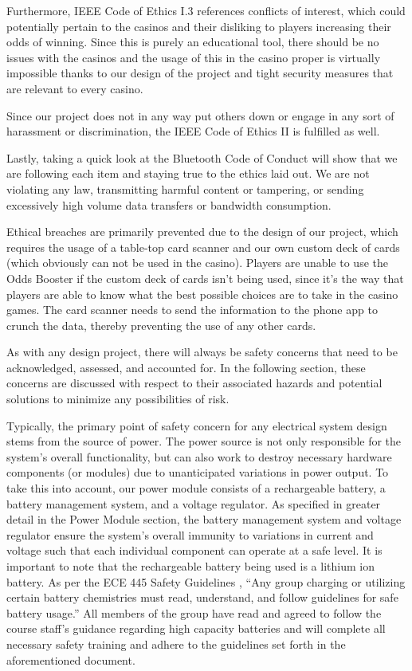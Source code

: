 \documentclass[12pt]{article}
\begin{document}
Furthermore, IEEE Code of Ethics I.3 \cite{IEEE_ethics} references conflicts of interest, which could potentially pertain to the casinos and their disliking to players increasing their odds of winning. Since this is purely an educational tool, there should be no issues with the casinos and the usage of this in the casino proper is virtually impossible thanks to our design of the project and tight security measures that are relevant to every casino.

Since our project does not in any way put others down or engage in any sort of harassment or discrimination, the IEEE Code of Ethics II \cite{IEEE_ethics} is fulfilled as well. 

Lastly, taking a quick look at the Bluetooth Code of Conduct \cite{BT_conduct} will show that we are following each item and staying true to the ethics laid out. We are not violating any law, transmitting harmful content or tampering, or sending excessively high volume data transfers or bandwidth consumption.

Ethical breaches are primarily prevented due to the design of our project, which requires the usage of a table-top card scanner and our own custom deck of cards (which obviously can not be used in the casino). Players are unable to use the Odds Booster if the custom deck of cards isn't being used, since it's the way that players are able to know what the best possible choices are to take in the casino games. The card scanner needs to send the information to the phone app to crunch the data, thereby preventing the use of any other cards. 

As with any design project, there will always be safety concerns that need to be acknowledged, assessed, and accounted for. In the following section, these concerns are discussed with respect to their associated hazards and potential solutions to minimize any possibilities of risk.

Typically, the primary point of safety concern for any electrical system design stems from the source of power. The power source is not only responsible for the system's overall functionality, but can also work to destroy necessary hardware components (or modules) due to unanticipated variations in power output. To take this into account, our power module consists of a rechargeable battery, a battery management system, and a voltage regulator. As specified in greater detail in the Power Module section, the battery management system and voltage regulator ensure the system's overall immunity to variations in current and voltage such that each individual component can operate at a safe level. It is important to note that the rechargeable battery being used is a lithium ion battery. As per the ECE 445 Safety Guidelines \cite{445_safety}, ``Any group charging or utilizing certain battery chemistries must read, understand, and follow guidelines for safe battery usage.'' All members of the group have read and agreed to follow the course staff's guidance regarding high capacity batteries \cite{Li_safety} and will complete all necessary safety training and adhere to the guidelines set forth in the aforementioned document. 
\end{document}

